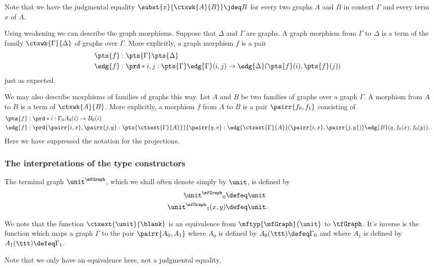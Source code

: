 \begin{rmk}
Note that we have the judgmental equality $\subst{x}{\ctxwk{A}{B}}\jdeq B$
for every two graphs $A$ and $B$ in context $\Gamma$ and every term $x$ of $A$.
\end{rmk}

\begin{rmk}
Using weakening we can describe the graph morphisms. Suppose that $\Delta$ and
$\Gamma$ are graphs. A graph morphism from $\Gamma$ to $\Delta$ is a term of 
the family $\ctxwk{\Gamma}{\Delta}$ of graphs over $\Gamma$. More explicitly,
a graph morphism $f$ is a pair
\begin{align*}
\pts{f} & : \pts{\Gamma}\pts{\Delta}\\
\edg{f} & : \prd*{i,j:\pts{\Gamma}} \edg{\Gamma}(i,j)\to\edg{\Delta}(\pts{f}(i),\pts{f}(j))
\end{align*}
just as expected.

We may also describe morphisms of families of graphs this way.
Let $A$ and $B$ be two families of graphs over a graph $\Gamma$. 
A morphism from $A$ to $B$ is a term of $\ctxwk{A}{B}$. More explicitly,
a morphism $f$ from $A$ to $B$ is a pair $\pairr{f_0,f_1}$
consisting of
\begin{align*}
\pts{f} & : \prd*{i:\Gamma_0} A_0(i)\to B_0(i)\\
\edg{f} & : \prd{\pairr{i,x},\pairr{j,y}:\pts{\ctxext{\Gamma}{A}}}{\pairr{q,e}:\edg{\ctxext{\Gamma}{A}}(\pairr{i,x},\pairr{j,y})} \edg{B}(q,f_0(x),f_0(y)).
\end{align*}
Here we have suppressed the notation for the projections.
\end{rmk}

\subsubsection{The interpretations of the type constructors}

\begin{defn}
The terminal graph $\unit^\mfGraph$, which we shall often denote simply 
by $\unit$, is defined by
\begin{align*}
{\unit^\mfGraph}_0 & \defeq \unit\\
{\unit^\mfGraph}_1(x,y) & \defeq \unit.
\end{align*}
\end{defn}

\begin{rmk}
We note that the function $\ctxext{\unit}{\blank}$ is an equivalence
from $\mftyp{\mfGraph}{\unit}$ to $\tfGraph$. It's inverse is the function which maps
a graph $\Gamma$ to the pair $\pairr{A_0,A_1}$ where $A_0$ is defined by
$A_0(\ttt)\defeq\Gamma_0$ and where $A_1$ is defined by $A_1(\ttt)\defeq
\Gamma_1$. 

Note that we only have an equivalence here, not a judgmental equality.
\end{rmk}

